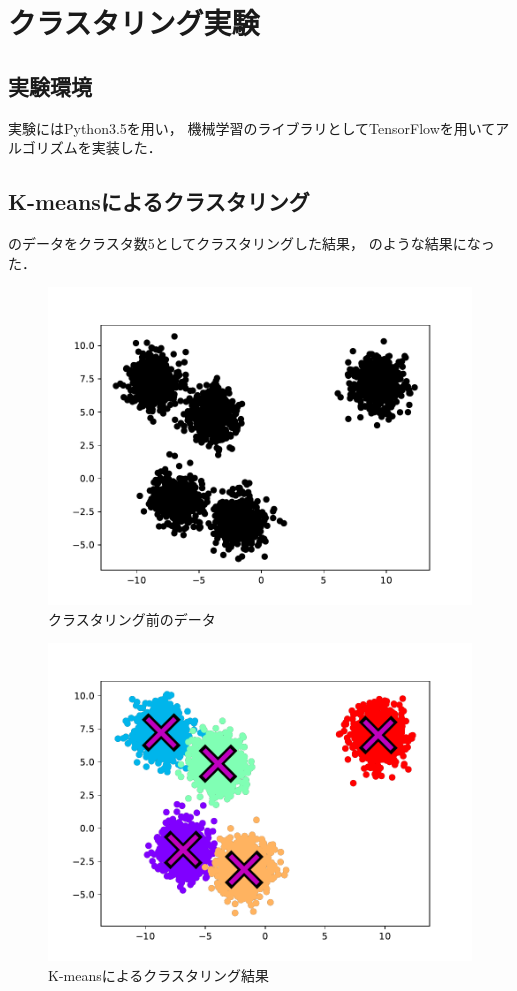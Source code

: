 \section{クラスタリング実験}

\subsection{実験環境}
実験にはPython3.5を用い，
機械学習のライブラリとしてTensorFlowを用いてアルゴリズムを実装した．

\subsection{K-meansによるクラスタリング}
のデータをクラスタ数5としてクラスタリングした結果，
のような結果になった．

\begin{figure}[htbp]
  \begin{center}
    \includegraphics[width=0.8\linewidth]{img/k-means/before.pdf}
    \caption{クラスタリング前のデータ}
    \label{img:kmeans-before}
  \end{center}
\end{figure}
\begin{figure}[htbp]
  \begin{center}
    \includegraphics[width=0.8\linewidth]{img/k-means/after.pdf}
    \caption{K-meansによるクラスタリング結果}
    \label{img:kmeans-after}
  \end{center}
\end{figure}

